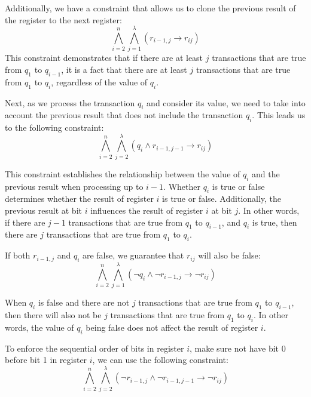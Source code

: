 Additionally, we have a constraint that allows us to clone the previous result of the register to the next register:
\begin{equation}
    \label{eq:relationship_between_q_i_and_previous_result}
    \bigwedge_{i=2}^{n} \bigwedge_{j=1}^{\lambda} \left( r_{i-1,j} \rightarrow r_{ij} \right)
\end{equation}
This constraint demonstrates that if there are at least $j$ transactions that are true from $q_1$ to $q_{i-1}$,
it is a fact that there are at least $j$ transactions that are true from $q_1$ to $q_i$, regardless of the value of $q_i$.

Next, as we process the transaction $q_i$ and consider its value, we need to take into account the previous result that does not include the transaction $q_i$.
This leads us to the following constraint:
\begin{equation}
    \label{eq:previous_result_without_q_i_true_and_q_i_true_then_register_true}
    \bigwedge_{i=2}^{n} \bigwedge_{j=2}^{\lambda} \left( q_{i} \wedge r_{i-1,j-1} \rightarrow r_{ij} \right)
\end{equation}

This constraint establishes the relationship between the value of $q_i$ and the previous result
when processing up to $i-1$.
Whether $q_i$ is true or false determines whether the result of register $i$
is true or false.
Additionally, the previous result at bit $i$ influences the result of register $i$ at bit $j$.
In other words, if there are $j-1$ transactions that are true from $q_1$ to $q_{i-1}$,
and $q_i$ is true, then there are $j$ transactions that are true from $q_1$ to $q_i$.

If both $r_{i-1,j}$ and $q_i$ are false, we guarantee that $r_{ij}$ will also be false:
\begin{equation}
    \label{eq:no_change_when_q_i_false}
    \bigwedge_{i=2}^{n} \bigwedge_{j=1}^{\lambda} \left( \neg q_{i} \wedge \neg r_{i-1,j} \rightarrow \neg r_{ij} \right)
\end{equation}

When $q_i$ is false and there are not $j$ transactions that are true from $q_1$ to $q_{i-1}$,
then there will also not be $j$ transactions that are true from $q_1$ to $q_i$.
In other words, the value of $q_i$ being false does not affect the result of register $i$.

To enforce the sequential order of bits in register $i$, make sure not have bit 0 before bit 1 in register $i$, we can use the following constraint:
\begin{equation}
    \label{eq:sequential_order}
    \bigwedge_{i=2}^{n} \bigwedge_{j=2}^{\lambda} \left( \neg r_{i-1,j} \wedge \neg r_{i-1,j-1} \rightarrow \neg r_{ij} \right)
\end{equation}


